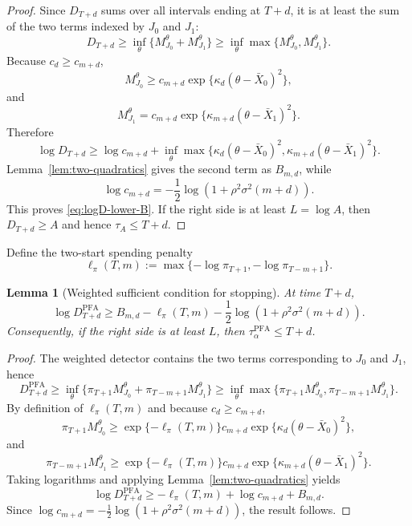 \documentclass[12pt]{article}
\theoremstyle{spaced}
\newtheorem{lemma}[lemma]{Lemma}
\theoremstyle{remark}
\begin{document}
\begin{proof}
Since $D_{T+d}$ sums over all intervals ending at $T+d$, it is at least the sum of the two terms indexed by $J_0$ and $J_1$:
\[
  D_{T+d}
  \ge
  \inf_\theta\{M_{J_0}^\theta+M_{J_1}^\theta\}
  \ge
  \inf_\theta\max\{M_{J_0}^\theta,M_{J_1}^\theta\}.
\]
Because $c_d\ge c_{m+d}$,
\[
  M_{J_0}^\theta
  \ge
  c_{m+d}\exp\{\kappa_d(\theta-\bar X_0)^2\},
\]
and
\[
  M_{J_1}^\theta
  =
  c_{m+d}\exp\{\kappa_{m+d}(\theta-\bar X_1)^2\}.
\]
Therefore
\[
  \log D_{T+d}
  \ge
  \log c_{m+d}
  +
  \inf_\theta\max\{\kappa_d(\theta-\bar X_0)^2,
                    \kappa_{m+d}(\theta-\bar X_1)^2\}.
\]
Lemma~\ref{lem:two-quadratics} gives the second term as $B_{m,d}$, while
\[
  \log c_{m+d}
  =-\frac{1}{2}\log(1+\rho^2\sigma^2(m+d)).
\]
This proves \eqref{eq:logD-lower-B}.  If the right side is at least $L=\log A$, then $D_{T+d}\ge A$ and hence $\tau_A\le T+d$.
\end{proof}
 Define the two-start spending penalty
\begin{equation}
\label{eq:ell-T-m}
  \ell_\pi(T,m)
  :=
  \max\{-\log\pi_{T+1},-\log\pi_{T-m+1}\}.
\end{equation}
\begin{lemma}[Weighted sufficient condition for stopping]
\label{lem:weighted-sufficient-stopping}
At time $T+d$,
\begin{equation}
\label{eq:weighted-logD-lower}
  \log D_{T+d}^{\mathrm{PFA}}
  \ge
  B_{m,d}
  -\ell_\pi(T,m)
  -\frac12\log(1+\rho^2\sigma^2(m+d)).
\end{equation}
Consequently, if the right side is at least $L$, then $\tau_\alpha^{\mathrm{PFA}}\le T+d$.
\end{lemma}

\begin{proof}
The weighted detector contains the two terms corresponding to $J_0$ and $J_1$, hence
\[
  D_{T+d}^{\mathrm{PFA}}
  \ge
  \inf_\theta\{\pi_{T+1}M_{J_0}^\theta+
                 \pi_{T-m+1}M_{J_1}^\theta\}
  \ge
  \inf_\theta\max\{\pi_{T+1}M_{J_0}^\theta,
                   \pi_{T-m+1}M_{J_1}^\theta\}.
\]
By definition of $\ell_\pi(T,m)$ and because $c_d\ge c_{m+d}$,
\[
  \pi_{T+1}M_{J_0}^\theta
  \ge
  \exp\{-\ell_\pi(T,m)\}
  c_{m+d}\exp\{\kappa_d(\theta-\bar X_0)^2\},
\]
and
\[
  \pi_{T-m+1}M_{J_1}^\theta
  \ge
  \exp\{-\ell_\pi(T,m)\}
  c_{m+d}\exp\{\kappa_{m+d}(\theta-\bar X_1)^2\}.
\]
Taking logarithms and applying Lemma~\ref{lem:two-quadratics} yields
\[
  \log D_{T+d}^{\mathrm{PFA}}
  \ge
  -\ell_\pi(T,m)+\log c_{m+d}+B_{m,d}.
\]
Since $\log c_{m+d}=-\frac12\log(1+\rho^2\sigma^2(m+d))$, the result follows.
\end{proof}
\end{document}
